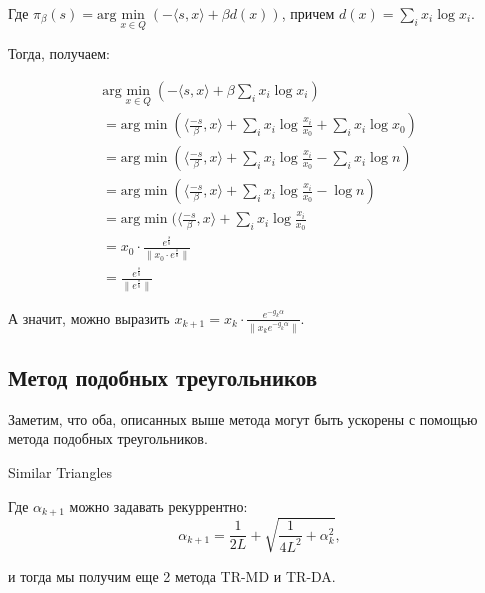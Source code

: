 \documentclass[a4paper,12pt]{article}
\theoremstyle{plain} %
\theoremstyle{definition} %
\theoremstyle{remark} %
\theoremstyle{definition}
\theoremstyle{definition}
\begin{document}
	Где $\pi_{\beta}(s) = \text{arg}\min\limits_{x \in Q}(-\langle s, x\rangle + \beta d(x))$, причем $d(x)= \sum\limits_{i}x_i \log x_i$.
	
    Тогда, получаем:
    
\begin{align*}
\text{arg}\min\limits_{x \in Q}(-\langle s, x\rangle + \beta \sum\limits_{i}x_i \log x_i)\\
=\text{arg}\min(\langle \frac{-s}{\beta}, x\rangle + \sum\limits_{i}x_i \log \frac{x_i}{x_0} + \sum\limits_{i}x_i \log x_0)\\
=\text{arg}\min(\langle \frac{-s}{\beta}, x\rangle + \sum\limits_{i}x_i \log \frac{x_i}{x_0} - \sum\limits_{i}x_i \log n)\\
=\text{arg}\min(\langle \frac{-s}{\beta}, x\rangle + \sum\limits_{i}x_i \log \frac{x_i}{x_0} - \log n)\\
=\text{arg}\min(\langle \frac{-s}{\beta}, x\rangle + \sum\limits_{i}x_i \log \frac{x_i}{x_0}\\
=x_0\cdot \frac{e^{\frac{s}{b}}}{\|x_0\cdot e^{\frac{s}{b}}\|}\\
=\frac{e^{\frac{s}{b}}}{\|e^{\frac{s}{b}}\|} 
\end{align*}
	
А значит, можно выразить $x_{k+1} = x_k\cdot \frac{e^{-g_k\alpha}}{\|x_k e^{-g_k\alpha}\|}$.	
    \subsection{Метод подобных треугольников}	
Заметим, что оба, описанных выше метода могут быть ускорены с помощью метода подобных треугольников.

\begin{algorithm}[h!]
		\caption{Similar Triangles}

		\begin{algorithmic}
		\end{algorithmic}
	\end{algorithm}
	
	Где $\alpha_{k+1}$ можно задавать рекуррентно:
	$$
	\alpha_{k+1}=\frac{1}{2L}+\sqrt{\frac{1}{4L^2}+\alpha_k^2},
	$$
	
	и тогда мы получим еще 2 метода TR-MD и TR-DA.
	
\end{document}
